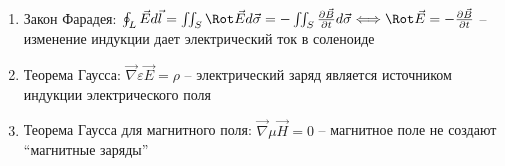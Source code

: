 \documentclass[12pt]{article}
\begin{document}
\begin{enumerate}[label*=\arabic** ]
\begin{enumerate}
            \item Закон Фарадея: $\oint_L \vec{E}d\vec{l} = \iint_S \Rot \vec{E}d\vec{\sigma} = -\iint_S \frac{\partial \vec{B}}{\partial t}d\vec{\sigma} \Longleftrightarrow
            \Rot \vec{E} = -\frac{\partial \vec{B}}{\partial t}$ -- изменение индукции дает электрический ток в соленоиде

            \item Теорема Гаусса: $\vec\nabla \varepsilon \vec{E} = \rho$ -- электрический заряд является источником индукции электрического поля

            \item Теорема Гаусса для магнитного поля: $\vec\nabla \mu \vec{H} = 0$ -- магнитное поле не создают \enquote{магнитные заряды}
        \end{enumerate}
    \end{enumerate}
\end{document}
